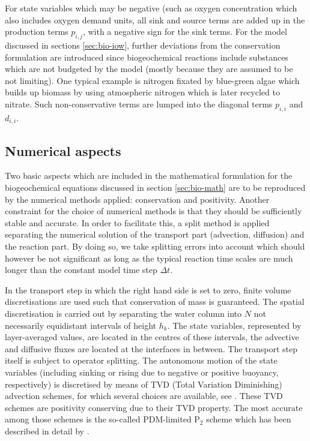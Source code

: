 For state variables which may
be negative (such as oxygen concentration
which also includes oxygen demand units,
all sink and source
terms are added up in the production terms
$p_{i,j}$, with a negative sign for the sink terms.
For the \cite{Neumannetal2002} model discussed in sections
\ref{sec:bio-iow},
further deviations from the conservation formulation are introduced since
biogeochemical reactions include substances which are not budgeted by the
model (mostly because they are assumed to be not limiting).
One typical example is nitrogen fixated by blue-green algae which
builds up biomass by using atmospheric nitrogen which is later recycled to
nitrate. Such non-conservative terms are lumped into the diagonal terms
$p_{i,i}$ and $d_{i,i}$.

\subsection{Numerical aspects}\label{sec:bio-num}

Two basic aspects which are included in the mathematical formulation for
the biogeochemical equations discussed in section \ref{sec:bio-math}
are to be reproduced by the numerical methods applied: conservation and
positivity. Another constraint for the choice
of numerical methods is that they should be sufficiently stable and accurate.
In order to facilitate this, a split method is applied
separating the numerical solution of the transport part
(advection, diffusion) and the reaction part.
By doing so, we take splitting errors into account which should however
be not significant as long as the typical reaction time scales are
much longer than the constant model time step $\Delta t$.

In the transport step
in which the right hand side is set to zero,
finite volume discretisations
are used such that conservation of mass is guaranteed.
The spatial discretisation is carried out by separating the water column
into $N$ not necessarily equidistant intervals of height $h_k$.
The state variables, represented by layer-averaged values,
are located in the centres of these intervals, the advective and diffusive
fluxes are located at the interfaces in between.
The transport step itself is subject to operator splitting.
The autonomous motion of the state variables (including sinking or
rising due to negative or positive buoyancy, respectively)
is discretised by means of
TVD (Total Variation
Diminishing) advection schemes, for which several choices are
available, see \cite{Pietrzak98}.
These TVD schemes are positivity conserving due to their TVD
property.
The most accurate among those
schemes is the so-called
PDM-limited P$_2$ scheme which has been described in detail
by \cite{Leonhard91}.

